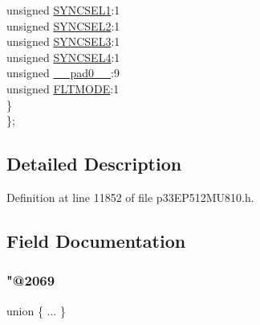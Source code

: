 \begin{DoxyCompactItemize}
\begin{tabbing}
\>\>unsigned \hyperlink{structtag_o_c11_c_o_n2_b_i_t_s_a50e73f95ab1c258ddc64f69c0991deaf}{SYNCSEL1}:1\\
\>\>unsigned \hyperlink{structtag_o_c11_c_o_n2_b_i_t_s_a304907a5d2c4cbf1114a54642a85951e}{SYNCSEL2}:1\\
\>\>unsigned \hyperlink{structtag_o_c11_c_o_n2_b_i_t_s_a6bbd1bd2ead6c9fa713969c6eb0f0c75}{SYNCSEL3}:1\\
\>\>unsigned \hyperlink{structtag_o_c11_c_o_n2_b_i_t_s_a0cd5bbe196c7974953909d27a6307bb7}{SYNCSEL4}:1\\
\>\>unsigned \hyperlink{structtag_o_c11_c_o_n2_b_i_t_s_adf71f3d8410c1f1dbbc96680a92c49af}{\_\_pad0\_\_}:9\\
\>\>unsigned \hyperlink{structtag_o_c11_c_o_n2_b_i_t_s_ad53c2a5303780172219bfd5e0100c782}{FLTMODE}:1\\
\>\} \\
\}; \\

\end{tabbing}\end{DoxyCompactItemize}


\subsection{Detailed Description}


Definition at line 11852 of file p33\+E\+P512\+M\+U810.\+h.



\subsection{Field Documentation}
\mbox{\label{structtag_o_c11_c_o_n2_b_i_t_s_a14e460db9bc5a4290198b4fa14424e88}} 
\subsubsection{\texorpdfstring{"@2069}{@2069}}
{\footnotesize\ttfamily union \{ ... \} }

\mbox{\label{structtag_o_c11_c_o_n2_b_i_t_s_adf71f3d8410c1f1dbbc96680a92c49af}} 
